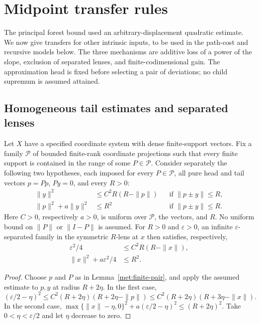 \section{Midpoint transfer rules}\label{met:transfer-section}
The principal forest bound used an arbitrary-displacement quadratic
estimate. We now give transfers for other intrinsic inputs, to be used
in the path-cost and recursive models below. The three mechanisms are
additive loss of a power of the slope, exclusion of separated lenses,
and finite-codimensional gain. The approximation head is fixed before
selecting a pair of deviations; no child supremum is assumed attained.

\subsection{Homogeneous tail estimates and separated lenses}
\begin{proposition}\label{met:tail-to-lens}
Let $X$ have a specified coordinate system with dense finite-support
vectors. Fix a family $\mathcal P$ of bounded finite-rank coordinate
projections such that every finite support is contained in the range of
some $P\in\mathcal P$. Consider separately the following two hypotheses,
each imposed for every $P\in\mathcal P$, all pure head and tail vectors
$p=Pp$, $Py=0$, and every $R>0$:
\begin{align}
 \|y\|^2&\le C^2 R(R-\|p\|)
 &&\text{if }\|p\pm y\|\le R, \label{met:radial-input}\\
 \|p\|^2+a\|y\|^2&\le R^2
 &&\text{if }\|p\pm y\|\le R. \label{met:square-input}
\end{align}
Here $C>0$, respectively $a>0$, is uniform over $\mathcal P$, the
vectors, and $R$. No uniform bound on $\|P\|$ or $\|I-P\|$ is assumed.
For $R>0$ and $\varepsilon>0$, an infinite $\varepsilon$-separated family in the symmetric $R$-lens at
$x$ then satisfies, respectively,
\begin{align}
 \varepsilon^2/4&\le C^2R(R-\|x\|),\label{met:radial-lens}\\
 \|x\|^2+a\varepsilon^2/4&\le R^2.\label{met:square-lens}
\end{align}
\end{proposition}
\begin{proof}
Choose $p$ and $P$ as in Lemma~\ref{met:finite-pair}, and apply the
assumed estimate to $p,y$ at radius $R+2\eta$. In the first case,
\[
 (\varepsilon/2-\eta)^2
 \le C^2(R+2\eta)(R+2\eta-\|p\|)
 \le C^2(R+2\eta)(R+3\eta-\|x\|).
\]
In the second case,
$\max\{\|x\|-\eta,0\}^2+a(\varepsilon/2-\eta)^2\le(R+2\eta)^2$.
Take $0<\eta<\varepsilon/2$ and let $\eta$ decrease to zero.
\end{proof}

